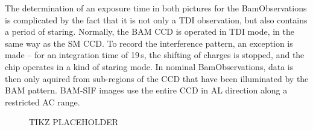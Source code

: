 \documentclass[a4paper, 11pt]{article}
\begin{document}
The determination of an exposure time in both pictures for the BamObservations is complicated by the fact that it is not only a TDI observation, but also contains a period of staring. Normally, the BAM CCD is operated in TDI mode, in the same way as the SM CCD. To record the interference pattern, an exception is made -- for an integration time of 19\,s, the shifting of charges is stopped, and the chip operates in a kind of staring mode. In nominal BamObservations, data is then only aquired from sub-regions of the CCD that have been illuminated by the BAM pattern. BAM-SIF images use the entire CCD in AL direction along a restricted AC range.

\begin{figure}[h]
  \centering
  {\Huge TIKZ PLACEHOLDER}
%
%
%
%
%
%

\end{figure}
\end{document}
